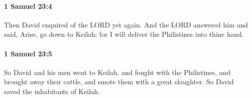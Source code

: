 		\paragraph{1 Samuel 23:4} %
			\label{1SAMUEL-23-4}

			Then David enquired of the LORD yet again. And the LORD answered him and said, Arise, go down to Keilah; for I will deliver the Philistines into thine hand.


		\paragraph{1 Samuel 23:5} %
			\label{1SAMUEL-23-5}

			So David and his men went to Keilah, and fought with the Philistines, and brought away their cattle, and smote them with a great slaughter. So David saved the inhabitants of Keilah.


